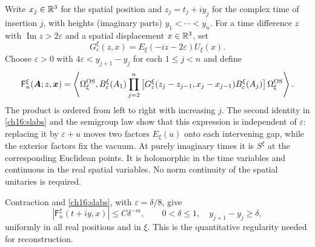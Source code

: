 Write $x_j\in\mathbb R^3$ for the spatial position and $z_j=t_j+iy_j$ for
the complex time of insertion $j$, with heights (imaginary parts) $y_1<\cdots<y_n$.
For a time difference $z$ with $\operatorname{Im}z>2\varepsilon$ and
a spatial displacement $x\in\mathbb R^3$, set
\[
 G_\varepsilon^\xi(z,x)
       =E_\xi(-iz-2\varepsilon)U_\xi(x).
\]
Choose $\varepsilon>0$ with $4\varepsilon<y_{j+1}-y_j$ for each $1\le j<n$
and define
\begin{equation}
 \mathsf F_n^\xi(\boldsymbol A;z,\boldsymbol x)
  =\left\langle\Omega_\xi^{\rm OS},
    B_\varepsilon^\xi(A_1)
    \prod_{j=2}^n\left[
       G_\varepsilon^\xi(z_j-z_{j-1},x_j-x_{j-1})
       B_\varepsilon^\xi(A_j)\right]\Omega_\xi^{\rm OS}\right\rangle.
 \label{ch16:heat-function}
\end{equation}
The product is ordered from left to right with increasing $j$.
The second identity in \eqref{ch16:slabs} and the semigroup law show that this expression is independent
of $\varepsilon$: replacing it by $\varepsilon+u$ moves two factors
$E_\xi(u)$ onto each intervening gap, while the exterior factors fix the
vacuum. At purely imaginary times it is $S^\xi$ at the corresponding
Euclidean points. It is holomorphic in the time variables and continuous
in the real spatial variables. No norm continuity of the spatial
unitaries is required.

Contraction and \eqref{ch16:slabs}, with $\varepsilon=\delta/8$, give
\begin{equation}
 |\mathsf F_n^\xi(t+iy,x)|\le C\delta^{-m},\qquad
 0<\delta\le1,\quad y_{j+1}-y_j\ge\delta,
 \label{ch16:gap-bound}
\end{equation}
uniformly in all real positions and in $\xi$.
This is the quantitative regularity needed for reconstruction.

